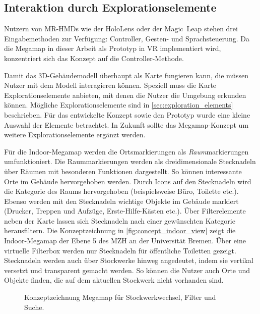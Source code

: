\subsection{Interaktion durch Explorationselemente}
Nutzern von MR-HMDs wie der HoloLens oder der Magic~Leap stehen drei Eingabemethoden zur Verfügung: Controller, Gesten- und Sprachsteuerung.
Da die Megamap in dieser Arbeit als Prototyp in VR implementiert wird, konzentriert sich das Konzept auf die Controller-Methode.

Damit das 3D-Gebäudemodell überhaupt als Karte fungieren kann, die müssen Nutzer mit dem Modell interagieren können.
Speziell muss die Karte Explorationselemente anbieten, mit denen die Nutzer die Umgebung erkunden können.
Mögliche Explorationselemente sind in \autoref{sec:exploration_elements} beschrieben.
Für das entwickelte Konzept sowie den Prototyp wurde eine kleine Auswahl der Elemente betrachtet.
In Zukunft sollte das Megamap-Konzept um weitere Explorationselemente ergänzt werden.

Für die Indoor-Megamap werden die Ortsmarkierungen als \emph{Raum}markierungen umfunktioniert.
Die Raummarkierungen werden als dreidimensionale Stecknadeln über Räumen mit besonderen Funktionen dargestellt.
So können interessante Orte im Gebäude hervorgehoben werden.
Durch Icons auf den Stecknadeln wird die Kategorie des Raums hervorgehoben (beispielsweise Büro, Toilette etc.).
Ebenso werden mit den Stecknadeln wichtige Objekte im Gebäude markiert (Drucker, Treppen und Aufzüge, Erste-Hilfe-Kästen etc.).
Über Filterelemente neben der Karte lassen sich Stecknadeln nach einer gewünschten Kategorie herausfiltern.
Die Konzeptzeichnung in \autoref{fig:concept_indoor_view} zeigt die Indoor-Megamap der Ebene 5 des MZH an der Universität Bremen.
Über eine virtuelle Filterbox werden nur Stecknadeln für öffentliche Toiletten gezeigt.
Stecknadeln werden auch über Stockwerke hinweg angedeutet, indem sie vertikal versetzt und transparent gemacht werden.
So können die Nutzer auch Orte und Objekte finden, die auf dem aktuellen Stockwerk nicht vorhanden sind.
\vfill
\begin{figure}[h]
	\centering
	\caption{Konzeptzeichnung Megamap für Stockwerkwechsel, Filter und Suche.}
	\label{fig:concept_indoor_view}
\end{figure}

